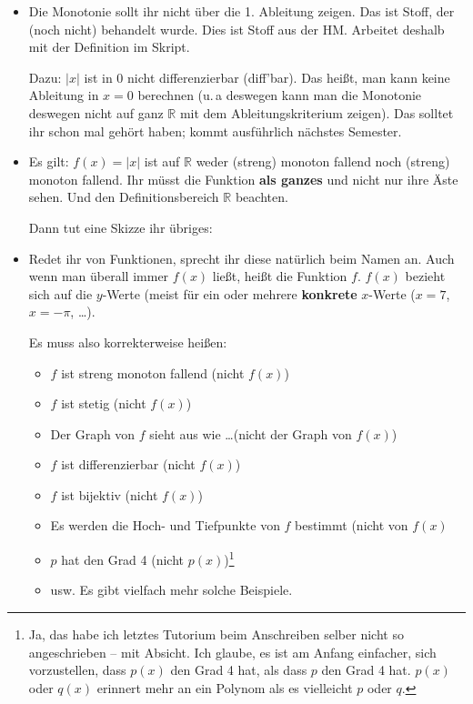 \documentclass[11pt, a4paper]{article}
\newcommand{\R}{\mathbb{R}}
\newcommand{\RM}[1]{\MakeUppercase{\romannumeral #1{}}}
\begin{document}
\begin{itemize}
\item Die Monotonie sollt ihr nicht über die 1. Ableitung zeigen. Das ist Stoff, der (noch nicht) behandelt wurde. Dies ist Stoff aus der  HM\RM{2}. Arbeitet deshalb mit der Definition im Skript. 

Dazu: $|x|$ ist in 0 nicht differenzierbar (diff'bar). Das heißt, man kann keine Ableitung in $x = 0$ berechnen (u.\,a deswegen kann man die Monotonie deswegen nicht auf ganz $\R$ mit dem Ableitungskriterium zeigen). Das solltet ihr schon mal gehört haben; kommt ausführlich nächstes Semester.

\item Es gilt: $f(x) = |x|$ ist auf $\R$ weder (streng) monoton fallend noch (streng) monoton fallend. Ihr müsst die Funktion \textbf{als ganzes} und nicht nur ihre Äste sehen. Und den Definitionsbereich $\R$ beachten.

Dann tut eine Skizze ihr übriges:

\begin{figure}
\centering
{}
\end{figure}


\item Redet ihr von Funktionen, sprecht ihr diese natürlich beim Namen an. Auch wenn man überall immer $f(x)$ ließt, heißt die Funktion $f$. $f(x)$ bezieht sich auf die $y$-Werte (meist für ein oder mehrere \textbf{konkrete} $x$-Werte ($x = 7$, $x = -\pi$, \dots).

Es muss also korrekterweise heißen:
\begin{itemize}
\item $f$ ist streng monoton fallend (nicht $f(x)$)
\item $f$ ist stetig (nicht $f(x)$)
\item Der Graph von $f$ sieht aus wie \dots (nicht der Graph von $f(x)$)
\item $f$ ist differenzierbar (nicht $f(x)$)
\item $f$ ist bijektiv (nicht $f(x)$)
\item Es werden die Hoch- und Tiefpunkte von $f$ bestimmt (nicht von $f(x)$
\item $p$ hat den Grad 4 (nicht $p(x)$)\footnote{Ja, das habe ich letztes Tutorium beim Anschreiben selber nicht so angeschrieben -- mit Absicht. Ich glaube, es ist am Anfang einfacher, sich vorzustellen, dass $p(x)$ den Grad 4 hat, als dass $p$ den Grad 4 hat. $p(x)$ oder $q(x)$ erinnert mehr an ein Polynom als es vielleicht $p$ oder $q$.}
\item usw. Es gibt vielfach mehr solche Beispiele.
\end{itemize}


\end{itemize}
\end{document}
